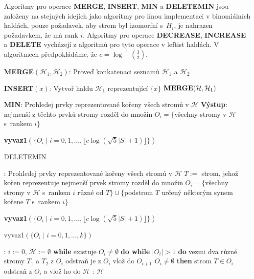 \documentclass[a4paper,12pt]{article}
\begin{document}
Algoritmy pro operace {\bf MERGE}, {\bf INSERT}, {\bf MIN} a 
{\bf DELE\-TEMIN} jsou založeny na stejných idejích jako algoritmy pro línou implementaci 
v binomiálních haldách, pouze poža\-da\-vek, aby strom byl 
izomorfní s~$H_i$, je nahrazen požadavkem, že má rank $
i$. 
Algoritmy pro ope\-race {\bf DECREASE}, {\bf INCREASE} a {\bf DELETE }
vycházejí z algoritmů pro tyto operace v leftist 
haldách. V algoritmech předpokládáme, že $c=\log^{-1}
(\frac 32)$.

{\bf MERGE$(\mathcal H_1,\mathcal H_2)$}:\newline 
Proveď konkatenaci seznamů $\mathcal H_1$ a $\mathcal H_2$

{\bf INSERT$(x)$}:\newline 
Vytvoř haldu $\mathcal H_1$ reprezentující $\{x\}$\newline 
$\bold M\bold E\bold R\bold G\bold E(\mathcal H,\mathcal H_1)$

{\bf MIN}:\newline 
Prohledej prvky reprezentované kořeny všech 
stromů v $\mathcal H$\newline 
{\bf Výstup}: nejmenší z těchto prvků\newline 
stromy rozděl do množin $O_i=\{$všechny stromy v 
$\mathcal H$ s~rankem $i\}$\newline 
{\bf vyvaz1$(\{O_i\mid i=0,1,\dots,\lfloor c\log(\sqrt 5|S|+1)\rfloor 
\})$

DELETEMIN}:\newline 
Prohledej prvky reprezentované kořeny všech 
stromů v $\mathcal H$\newline 
$T:=$ strom, jehož kořen reprezentuje nejmenší 
prvek\newline 
stromy rozděl do množin $O_i=\{$všechny stromy v 
$\mathcal H$ s~rankem $i$ různé od $T\}\cup \{$podstrom $T$ určený 
některým synem kořene $T$ s~rankem $i$$\}$\newline 
{\bf vyvaz1$(\{O_i\mid i=0,1,\dots,\lfloor c\log(\sqrt 5|S|+1)\rfloor 
\})$

vyvaz1$(\{O_i\mid i=0,1,\dots,k\})$}:\newline 
$i:=0$, $\mathcal H:=\emptyset$\newline 
{\bf while} existuje $O_i\ne\emptyset$ {\bf do\newline 
\phantom{{\rm ---}}while} $|O_i|>1$ {\bf do\newline 
\phantom{{\rm ------}}}vezmi dva různé stromy $T_1$ a $
T_2$ z 
$O_i$\newline 
\phantom{------}odstraň je z $O_i$\newline 
\phantom{------}{\bf spoj$(T_1,T_2)$} vlož do $O_{i+1}$\newline 
{} $O_i\ne\emptyset$ {\bf then\newline 
\phantom{{\rm ------}}}strom $T\in O_i$ odstraň z $O_i$ a vlož ho do $
\mathcal H$\newline 
{}: $\mathcal H$
\end{document}
